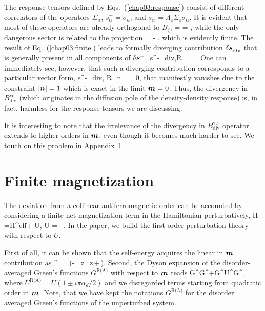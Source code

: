 The response tensors defined by Eqs.~(\ref{chap03:response}) consist of different correlators of the operators $\Sigma_\alpha$, $s^+_\alpha=\sigma_a$, and $s^-_\alpha = \Lambda_z\Sigma_z\sigma_\alpha$. It is evident that most of these operators are already orthogonal to $\bar{B}_\zeta$,
\be
\tr {} = \tr {}= \tr {},
\e
while the only dangerous sector is related to the projection
\be
\label{chap03:finite}
\tr {} = - ,
\e
which is evidently finite. The result of Eq.~(\ref{chap03:finite}) leads to formally diverging contribution $\delta \boldsymbol{s}^-_\textrm{div}$ that is generally present in all components of $\delta \boldsymbol{s}^-$, 
\be
\delta s^{-}_{\textrm{div},\alpha}\propto  R_\infty
\s_\beta {}  \,.
\e
One can immediately see, however, that such a diverging contribution corresponds to a particular vector form,
\be
\label{chap03:divergence}
\delta s^{-}_{\textrm{div},\alpha} \propto R_\infty n_\alpha\, \cdot{} =0,
\e
that manifestly vanishes due to the constraint $|\boldsymbol{n}|=1$ which is exact in the limit $\boldsymbol{m}=0$. Thus, the divergency in $B_\textrm{div}^\textrm{vc}$ (which originates in the diffusion pole of the density-density response) is, in fact, harmless for the response 
tensors we are discussing. 

It is interesting to note that the irrelevance of the divergency in $B_\textrm{div}^\textrm{vc}$ operator extends to higher orders in $\boldsymbol{m}$, even though it becomes much harder to see. We touch on this problem in Appendix~\ref{chap03:sec:appd}. 

\section{Finite magnetization}\label{chap03:sec:appd}
The deviation from a collinear antiferromagnetic order can be accounted by considering a finite net magnetization term in the Hamiltonian perturbatively,
\be
H =H^\textrm{eff}+ U, \qquad U = -\Delta\,\cdot\bb{\sigma}.
\e
In the paper, we build the first order perturbation theory with respect to $U$. 

First of all, it can be shown that the self-energy acquires the linear in $\boldsymbol{m}$ contribution as
\be\label{chap03:chap3:eq:SEcorr}
\im \Sigma^ = \mp{}\,(\ep-\Delta\,\Lambda_z\Sigma_z\,\cdot\bb{\sigma}+\Delta\,\cdot\bb{\sigma}).
\e
Second, the Dyson expansion of the disorder-averaged Green's functions $G^\text{R(A)}$ with respect to $\boldsymbol{m}$ reads
\be
G^\rightarrow G^+G^U^G^,
\e
where $U^\text{R(A)}=U(1 \pm i \pi\alpha_d/2)$ and we disregarded terms starting from quadratic order in $\boldsymbol{m}$. Note, that 
we have kept the notations $G^\text{R(A)}$ for the disorder averaged Green's functions of the unperturbed system. 

